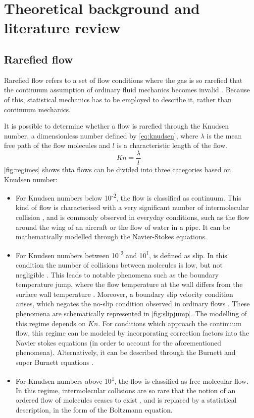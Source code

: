 \section{Theoretical background and literature review}
\label{section:2}

\subsection{Rarefied flow}
Rarefied flow refers to a set of flow conditions where the gas is so rarefied that the continuum assumption of ordinary fluid mechanics becomes invalid \cite{aerothermonotes}. Because of this, statistical mechanics has to be employed to describe it, rather than continuum mechanics.

It is possible to determine whether a flow is rarefied through the Knudsen number, a dimensionless number defined by \autoref{eq:knudsen}, where $\lambda$ is the mean free path of the flow molecules and $l$ is a characteristic length of the flow.
\begin{equation}
    Kn=\frac{\lambda}{l}
    \label{eq:knudsen}
\end{equation}
\autoref{fig:regimes} shows thta flows can be divided into three categories based on Knudsen number:
\begin{itemize}
    \item For Knudsen numbers below 10\textsuperscript{-2}, the flow is classified as continuum. This kind of flow is characterised with a very significant number of intermolecular collision \cite{aerothermonotes, chambrerarefied}, and is commonly observed in everyday conditions, such as the flow around the wing of an aircraft or the flow of water in a pipe. It can be mathematically modelled through the Navier-Stokes equations.
    \item For Knudsen numbers between 10\textsuperscript{-2} and 10\textsuperscript{1}, is defined as slip. In this condition the number of collisions between molecules is low, but not negligible \cite{chambrerarefied}. This leads to notable phenomena such as the boundary temperature jump, where the flow temperature at the wall differs from the surface wall temperature \cite{slipjump}. Moreover, a boundary slip velocity condition arises, which negates the no-slip condition observed in ordinary flows \cite{slipjump}. These phenomena are schematically represented in \autoref{fig:slipjump}. The modelling of this regime depends on $Kn$. For conditions which approach the continuum flow, this regime can be modeled by incorporating correction factors into the Navier stokes equations \cite{slipjump} (in order to account for the aforementioned phenomena). Alternatively, it can be described through the Burnett and super Burnett equations \cite{burnett}.
    \item For Knudsen numbers above 10\textsuperscript{1}, the flow is classified as free molecular flow. In this regime, intermolecular collisions are so rare that the notion of an ordered flow of molecules ceases to exist \cite{aerothermonotes, chambrerarefied}, and is replaced by a statistical description, in the form of the Boltzmann equation.
\end{itemize}

